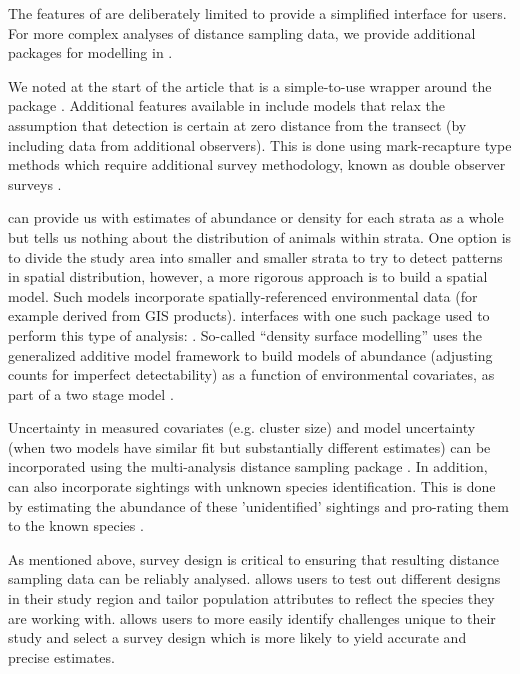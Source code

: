 \documentclass[article]{jss}
\begin{document}
The features of  are deliberately limited to provide a simplified interface for users. For more complex analyses of distance sampling data, we provide additional packages for modelling in .

We noted at the start of the article that  is a simple-to-use wrapper around the package . Additional features available in  include  models that relax the assumption that detection is certain at zero distance from the transect (by including data from additional observers). This is done using mark-recapture type methods which require additional survey methodology, known as double observer surveys \citep[see][for an introduction]{Burt:2014gu}.

 can provide us with estimates of abundance or density for each strata as a whole but tells us nothing about the distribution of animals within strata. One option is to divide the study area into smaller and smaller strata to try to detect patterns in spatial distribution, however, a more rigorous approach is to build a spatial model. Such models incorporate spatially-referenced environmental data (for example derived from GIS products).  interfaces with one such package used to perform this type of analysis:  \citep{dsm-pkg}. So-called ``density surface modelling'' uses the generalized additive model framework \citep[e.g.][]{Wood:2006vg} to build models of abundance (adjusting counts for imperfect detectability) as a function of environmental covariates, as part of a two stage model \citep{Hedley:2004et, Miller:2013fq}.

Uncertainty in measured covariates (e.g. cluster size) and model uncertainty (when two models have similar fit but substantially different estimates) can be incorporated using the multi-analysis distance sampling package  \citep{mads-pkg}. In addition,  can also incorporate sightings with unknown species identification. This is done by estimating the abundance of these 'unidentified' sightings and pro-rating them to the known species \citep{Gerrodette:2005}.

As mentioned above, survey design is critical to ensuring that resulting distance sampling data can be reliably analysed.  allows users to test out different designs in their study region and tailor population attributes to reflect the species they are working with.  \citep{DSsim-pkg} allows users to more easily identify challenges unique to their study and select a survey design which is more likely to yield accurate and precise estimates. 
\end{document}
